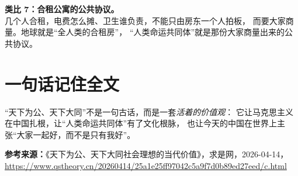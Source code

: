 \documentclass[11pt,a4paper]{ctexart}
\begin{document}
\begin{lifeblock}
\textbf{类比 7：合租公寓的公共协议。}\\
几个人合租，电费怎么摊、卫生谁负责，不能只由房东一个人拍板，
而要大家商量。地球就是``全人类的合租房''，
``人类命运共同体''就是那份大家商量出来的公共协议。
\end{lifeblock}

\section{一句话记住全文}

\begin{keypointblock}
``天下为公、天下大同''不是一句古话，而是一套\emph{活着的价值观}：
它让马克思主义在中国扎根，让``人类命运共同体''有了文化根脉，
也让今天的中国在世界上主张``大家一起好，而不是只有我好''。
\end{keypointblock}

\bigskip
\noindent\textbf{参考来源：}《天下为公、天下大同社会理想的当代价值》，求是网，2026-04-14，\\
\url{https://www.qstheory.cn/20260414/25a1e25ff97042c5a9f7d0b89ed27eed/c.html}
\end{document}
